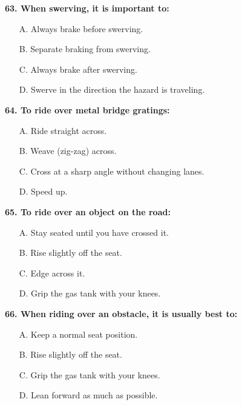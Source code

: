 \begin{minipage}{\linewidth}
\vspace{1em}\noindent\textbf{63. When swerving, it is important to:}

\begin{itemize}[nosep,leftmargin=2em]
\item [A.] Always brake before swerving.
\item [B.] Separate braking from swerving.
\item [C.] Always brake after swerving.
\item [D.] Swerve in the direction the hazard is traveling.

\end{itemize}
\end{minipage}


\begin{minipage}{\linewidth}
\vspace{1em}\noindent\textbf{64. To ride over metal bridge gratings:}

\begin{itemize}[nosep,leftmargin=2em]
\item [A.] Ride straight across.
\item [B.] Weave (zig-zag) across.
\item [C.] Cross at a sharp angle without changing lanes.
\item [D.] Speed up.

\end{itemize}
\end{minipage}


\begin{minipage}{\linewidth}
\vspace{1em}\noindent\textbf{65. To ride over an object on the road:}

\begin{itemize}[nosep,leftmargin=2em]
\item [A.] Stay seated until you have crossed it.
\item [B.] Rise slightly off the seat.
\item [C.] Edge across it.
\item [D.] Grip the gas tank with your knees.

\end{itemize}
\end{minipage}


\begin{minipage}{\linewidth}
\vspace{1em}\noindent\textbf{66. When riding over an obstacle, it is usually best to:}

\begin{itemize}[nosep,leftmargin=2em]
\item [A.] Keep a normal seat position.
\item [B.] Rise slightly off the seat.
\item [C.] Grip the gas tank with your knees.
\item [D.] Lean forward as much as possible.

\end{itemize}
\end{minipage}



